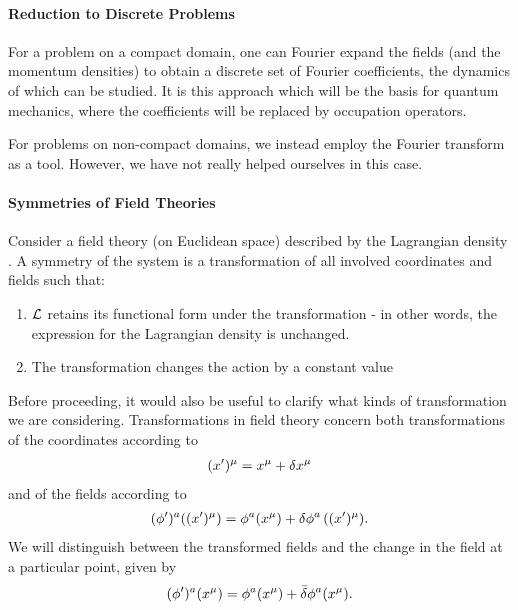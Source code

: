 
\paragraph{Reduction to Discrete Problems}
For a problem on a compact domain, one can Fourier expand the fields (and the momentum densities) to obtain a discrete set of Fourier coefficients, the dynamics of which can be studied. It is this approach which will be the basis for quantum mechanics, where the coefficients will be replaced by occupation operators.

For problems on non-compact domains, we instead employ the Fourier transform as a tool. However, we have not really helped ourselves in this case.


\paragraph{Symmetries of Field Theories}
Consider a field theory (on Euclidean space) described by the Lagrangian density \lag. A symmetry of the system is a transformation of all involved coordinates and fields such that:
\begin{enumerate}
	\item $\mathcal{L}$ retains its functional form under the transformation - in other words, the expression for the Lagrangian density is unchanged.
	\item The transformation changes the action by a constant value
\end{enumerate}

Before proceeding, it would also be useful to clarify what kinds of transformation we are considering. Transformations in field theory concern both transformations of the coordinates according to
\begin{align*}
	(x^{\prime})^{\mu} = x^{\mu} + \var{x^{\mu}}
\end{align*}
and of the fields according to
\begin{align*}
	(\phi^{\prime})^{a}((x^{\prime})^{\mu}) = \phi^{a}(x^{\mu}) + \var{\phi^{a}}((x^{\prime})^{\mu}).
\end{align*}
We will distinguish between the transformed fields and the change in the field at a particular point, given by
\begin{align*}
	(\phi^{\prime})^{a}(x^{\mu}) = \phi^{a}(x^{\mu}) + \bar{\delta}\phi^{a}(x^{\mu}).
\end{align*}

